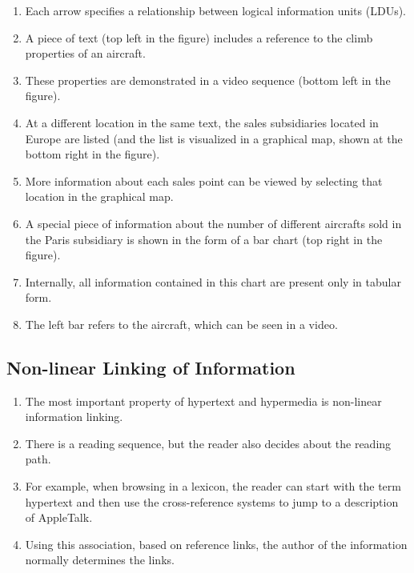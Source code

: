 \begin{multicols}{2}
\begin{enumerate}
	\item Each arrow specifies a relationship between logical information units (LDUs). 
	\item A piece of text (top left in the figure) includes a reference to the climb properties of an aircraft. 
	\item These properties are demonstrated in a video sequence (bottom left in the figure). 
	\item At a different location in the same text, the sales subsidiaries located in Europe are listed (and the list is visualized in a graphical map, shown at the bottom right in the figure).
	\item More information about each sales point can be viewed by selecting that location in the graphical	map. 
	\item A special piece of information about the number of different aircrafts sold in the Paris subsidiary is shown in the form of a bar chart (top right in the figure). \item Internally, all information contained in this chart are present only in tabular form. 
	\item The left bar refers to the aircraft, which can be seen in a video.
\end{enumerate}

\end{multicols}


\subsection*{Non-linear Linking of Information}
\begin{multicols}{2}
	\begin{enumerate}
	\item The most important property of hypertext and hypermedia is non-linear information linking. 
	\item There is a reading sequence, but the reader also decides about the reading path. 
	\item For example, when browsing in a lexicon, the reader can start with the term hypertext and then use the cross-reference systems to jump to a description of AppleTalk. 
	\item Using this association, based on reference links, the	author of the information normally determines the links.
	\end{enumerate}
\end{multicols}


